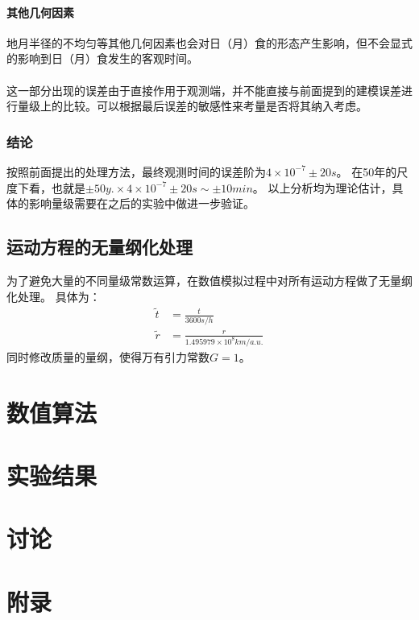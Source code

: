\documentclass[hidelinks]{article}
\begin{document}
\paragraph{其他几何因素}
地月半径的不均匀等其他几何因素也会对日（月）食的形态产生影响，但不会显式的影响到日（月）食发生的客观时间。
\\
\\
这一部分出现的误差由于直接作用于观测端，并不能直接与前面提到的建模误差进行量级上的比较。可以根据最后误差的敏感性来考量是否将其纳入考虑。
\subsubsection{结论}
按照前面提出的处理方法，最终观测时间的误差阶为$4\times10^{-7}\pm20s$。
在50年的尺度下看，也就是$\pm50 y.\times 4\times10^{-7}\pm20 s\sim \pm10min$。
以上分析均为理论估计，具体的影响量级需要在之后的实验中做进一步验证。
\subsection{运动方程的无量纲化处理}
为了避免大量的不同量级常数运算，在数值模拟过程中对所有运动方程做了无量纲化处理。
具体为：
\begin{align*}
    \tilde{t}&=\frac{t}{3600s/h}\\
    \tilde{r}&=\frac{r}{1.495979\times10^8km/a.u.}
\end{align*}
同时修改质量的量纲，使得万有引力常数$G=1$。
\section{数值算法}

\section{实验结果}

\section{讨论}

\section{附录}
\end{document}
